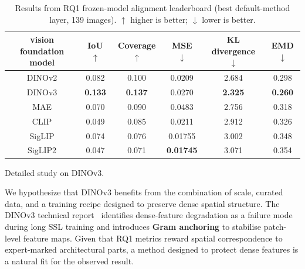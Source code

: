 \documentclass[lineno,pdflatex,sn-mathphys-num]{sn-jnl}%
\theoremstyle{thmstyleone}%
\theoremstyle{thmstyletwo}%
\theoremstyle{thmstylethree}%
\begin{document}
\begin{table}[!h]
\centering
\caption{Results from RQ1 frozen-model alignment leaderboard (best default-method layer, 139 images). $\uparrow$ higher is better; $\downarrow$ lower is better. \label{table RQ1 result}}
\begin{tabular}{cccccc}
\toprule
vision foundation model & IoU $\uparrow$ & Coverage $\uparrow$ & MSE $\downarrow$ & KL divergence $\downarrow$ & EMD $\downarrow$ \\
\midrule
DINOv2    & 0.082 & 0.100 & 0.0209 & 2.684 & 0.298 \\
DINOv3     & \textbf{0.133} & \textbf{0.137} & 0.0270 & \textbf{2.325} & \textbf{0.260} \\
MAE        & 0.070 & 0.090 & 0.0483 & 2.756 & 0.318 \\
CLIP      & 0.049 & 0.085 & 0.0211 & 2.912 & 0.326 \\
SigLIP    & 0.074 & 0.076 & 0.01755 & 3.002 & 0.348 \\
SigLIP2   & 0.047 & 0.071 & \textbf{0.01745} & 3.071 & 0.354 \\
\bottomrule
\end{tabular}
\end{table}


Detailed study on DINOv3.

We hypothesize that DINOv3 benefits from the combination of scale, curated data, and a training recipe designed to preserve dense spatial structure. The DINOv3 technical report~\cite{Simeoni26DINOv3} identifies dense-feature degradation as a failure mode during long SSL training and introduces \textbf{Gram anchoring} to stabilise patch-level feature maps. Given that RQ1 metrics reward spatial correspondence to expert-marked architectural parts, a method designed to protect dense features is a natural fit for the observed result.
\end{document}
